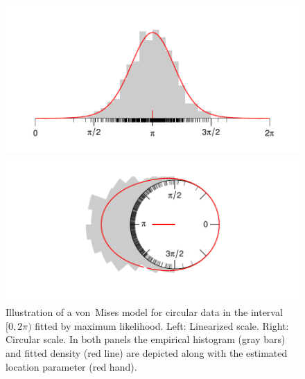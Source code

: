 \documentclass[nojss,shortnames]{jss}
\numberwithin{equation}{section}
\begin{document}
\begin{figure}[t]
  \begin{minipage}{.05\textwidth}
    \hfill
  \end{minipage}%
  \begin{minipage}{.45\textwidth}
    \vspace{-1em}
    \includegraphics[width=1.05\linewidth]{density_linear.pdf}
  \end{minipage}%
  \begin{minipage}{.45\textwidth}
    \includegraphics[width=1.2\linewidth]{density_circular.pdf}
  \end{minipage}
  \begin{minipage}{.05\textwidth}
    \hfill
  \end{minipage}%
  \caption{\label{fig:densities} Illustration of a von~Mises model for circular data in
    the interval $[0, 2\pi)$ fitted by maximum likelihood. Left: Linearized
    scale. Right: Circular scale. In both panels the empirical histogram (gray bars)
    and fitted density (red line) are depicted along with the estimated location
    parameter (red hand).}
\end{figure}
\end{document}

